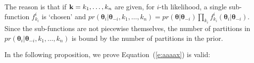 The reason is that if  $\textbf{k}=k_1, \ldots, k_n$ are given, for $i$-th 
likelihood, a single sub-function $f^i_{k_i}$ is `chosen' and
$pr(\boldsymbol\theta_i | \boldsymbol\theta_{-i}, k_1, \ldots, k_n) = 
pr(\boldsymbol\theta | \boldsymbol\theta_{-i})\prod_{k_i} f^i_{k_i}(\boldsymbol\theta_i | \boldsymbol\theta_{-i})$.
Since the sub-functions are not piecewise themselves, 
the number of partitions in $pr(\boldsymbol\theta_i | \boldsymbol\theta_{-i},  k_1, \ldots, k_n)$ is bound by the number of partitions in the prior.

In the following proposition, we prove Equation~(\ref{e:aaaax}) is valid:

